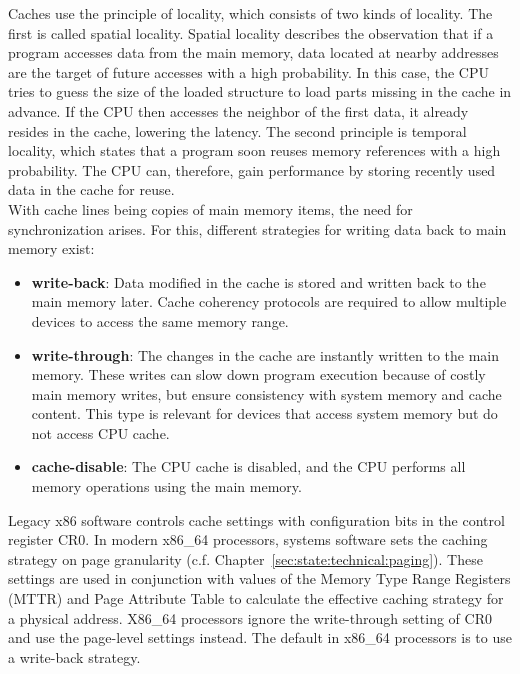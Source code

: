 Caches use the principle of locality, which consists of two kinds of locality.
The first is called spatial locality. Spatial locality describes the observation
that if a program accesses data from the main memory, data located at nearby
addresses are the target of future accesses with a high probability. In this
case, the CPU tries to guess the size of the loaded structure to load parts
missing in the cache in advance. If the CPU then accesses the neighbor of the
first data, it already resides in the cache, lowering the latency. The second
principle is temporal locality, which states that a program soon reuses memory
references with a high probability. The CPU can, therefore, gain performance by
storing recently used data in the cache for reuse.\\

With cache lines being copies of main memory items, the need for synchronization
arises. For this, different strategies for writing data back to main memory
exist:
\begin{itemize}
  \item \textbf{write-back}: Data modified in the cache is stored and written
    back to the main memory later. Cache coherency protocols are required to
    allow multiple devices to access the same memory range.
  \item \textbf{write-through}: The changes in the cache are instantly written
    to the main memory. These writes can slow down program execution because of
    costly main memory writes, but ensure consistency with system memory and
    cache content. This type is relevant for devices that access system memory
    but do not access CPU cache.
  \item \textbf{cache-disable}: The CPU cache is disabled, and the CPU
    performs all memory operations using the main memory.
\end{itemize}
Legacy x86 software controls cache settings with configuration bits in the
control register CR0. In modern x86\_64 processors, systems software sets the
caching strategy on page granularity (c.f.
Chapter~\ref{sec:state:technical:paging}). These settings are used in
conjunction with values of the Memory Type Range Registers (MTTR) and Page
Attribute Table to calculate the effective caching strategy for a physical
address. X86\_64 processors ignore the write-through setting of CR0 and use the
page-level settings instead. \cite{amd_manual} The default in x86\_64 processors
is to use a write-back strategy.

